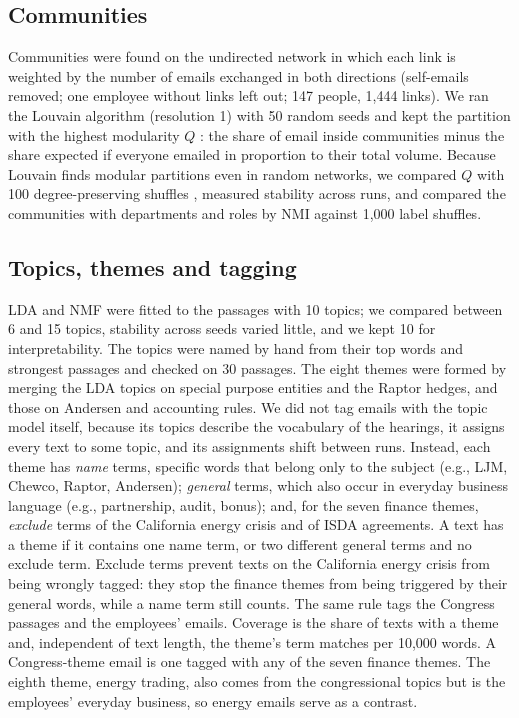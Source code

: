 \documentclass[9pt,twocolumn,twoside]{pnas-new}
\begin{document}
\subsection*{Communities}
Communities were found on the undirected network in which each link is weighted by the
number of emails exchanged in both directions (self-emails removed; one employee without
links left out; 147 people, 1,444 links). We ran the Louvain algorithm \cite{blondel2008}
(resolution 1) with 50 random seeds and kept the partition with the highest modularity $Q$
\cite{newman2004}: the share of email inside communities minus the share expected if everyone
emailed in proportion to their total volume. Because Louvain finds modular partitions even in random networks, we compared $Q$ with 100
degree-preserving shuffles \cite{maslov2002}, measured stability across runs, and compared the
communities with departments and roles by NMI \cite{danon2005} against 1,000 label shuffles.

\subsection*{Topics, themes and tagging}
LDA \cite{blei2003} and NMF \cite{lee1999} were fitted to the passages with 10 topics; we
compared between 6 and 15 topics, stability across seeds varied little, and we kept 10 for
interpretability. The topics were named by hand from their top words and strongest passages
and checked on 30 passages. The eight themes were formed by merging the LDA topics on special
purpose entities and the Raptor hedges, and those on Andersen and accounting rules. We did not
tag emails with the topic model itself, because its topics describe the vocabulary of the
hearings, it assigns every text to some topic, and its assignments shift between runs.
Instead, each theme has \emph{name} terms, specific words that belong only to the subject
(e.g., LJM, Chewco, Raptor, Andersen); \emph{general} terms, which also occur in everyday
business language (e.g., partnership, audit, bonus); and, for the seven finance themes,
\emph{exclude} terms of the California energy crisis and of ISDA agreements. A text has a
theme if it contains one name term, or two different general terms and no exclude term.
Exclude terms prevent texts on the California energy crisis from being wrongly tagged: they
stop the finance themes from being triggered by their general words, while a name term still
counts. The same rule tags the Congress passages and the employees' emails. Coverage is the
share of texts with a theme and, independent of text length, the theme's term matches per
10,000 words. A Congress-theme email is one tagged with any of the seven finance themes. The
eighth theme, energy trading, also comes from the congressional topics but is the employees'
everyday business, so energy emails serve as a contrast.
\end{document}
